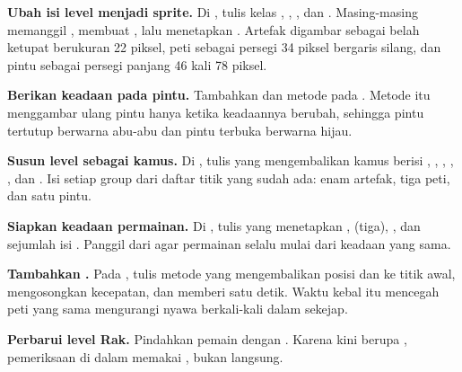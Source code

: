 \begin{langkah}
  \item \textbf{Ubah isi level menjadi sprite.} Di
        , tulis kelas ,
        , , dan . Masing-masing
        memanggil , membuat , lalu
        menetapkan . Artefak digambar sebagai belah ketupat
        berukuran 22 piksel, peti sebagai persegi 34 piksel bergaris silang,
        dan pintu sebagai persegi panjang 46 kali 78 piksel.

  \item \textbf{Berikan keadaan pada pintu.} Tambahkan  dan metode  pada . Metode itu
        menggambar ulang pintu hanya ketika keadaannya berubah, sehingga pintu
        tertutup berwarna abu-abu dan pintu terbuka berwarna hijau.

  \item \textbf{Susun level sebagai kamus.} Di , tulis
         yang mengembalikan kamus berisi ,
        , , , , dan
        . Isi setiap group dari daftar titik yang sudah ada:
        enam artefak, tiga peti, dan satu pintu.

  \item \textbf{Siapkan keadaan permainan.} Di , tulis
         yang menetapkan ,
         (tiga), , dan
         sejumlah isi . Panggil
         dari  agar permainan selalu mulai dari
        keadaan yang sama.

  \item \textbf{Tambahkan .} Pada , tulis metode
        yang mengembalikan posisi dan  ke titik awal, mengosongkan
        kecepatan, dan memberi  satu detik. Waktu kebal itu
        mencegah peti yang sama mengurangi nyawa berkali-kali dalam sekejap.

  \item \textbf{Perbarui level Rak.} Pindahkan pemain dengan
        . Karena
         kini berupa , pemeriksaan di dalam
         memakai , bukan  langsung.


\end{langkah}

